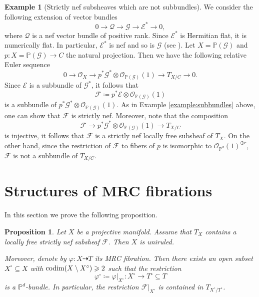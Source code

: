 \documentclass[english,reqno]{amsart}
\newcommand\bbP{{\mathbb P}}
\newcommand\sE{{\mathscr E}}
\newcommand\sF{{\mathscr F}}
\newcommand\sG{{\mathscr G}}
\newcommand\sO{{\mathscr O}}
\newcommand\sQ{{\mathscr Q}}
\newcommand{\codim}{{\rm codim}}
\theoremstyle{plain}
\newtheorem{prop}[thm]{Proposition}
\theoremstyle{definition}
\newtheorem{example}[thm]{Example}
\numberwithin{equation}{section} %
\begin{document}
\begin{example}[Strictly nef subsheaves which are not subbundles]\label{example:not-subbundles}
    We consider the following extension of vector bundles
    \[0\rightarrow \sQ\rightarrow \sG\rightarrow \sE^*\rightarrow 0,\]
    where $\sQ$ is a nef vector bundle of positive rank.    Since $\sE^*$ is Hermitian flat, it is numerically flat. In particular, $\sE^*$ is nef and so is $\sG$ (see \cite[Proposition 1.15]{DemaillyPeternellSchneider1994}).
    Let $X=\bbP(\sG)$ and  $p\colon X= \bbP(\sG)\rightarrow C$ the natural projection. Then we have the following relative Euler sequence
    \[0\rightarrow \sO_X\rightarrow p^*\sG^*\otimes\sO_{\bbP(\sG)}(1)\rightarrow T_{X/C}\rightarrow 0.\]
    Since $\sE$ is a subbundle of $\sG^*$, it follows that
    $$ \sF \coloneqq p^*\sE\otimes \sO_{\bbP(\sG)}(1)$$ is a subbundle of $p^*\sG^*\otimes \sO_{\bbP(\sG)}(1)$.
    As in Example \ref{example:subbundles} above, one can  show that  $\sF$ is strictly nef.
    Moreover,  note that the composition
    \[\sF \rightarrow p^*\sG^*\otimes \sO_{\bbP(\sG)}(1)\rightarrow T_{X/C}\]
    is injective, it follows that $\sF$ is a strictly nef locally free subsheaf of $T_X$. On the other hand, since the restriction of $\sF$ to fibers of $p$ is isomorphic to $\sO_{\bbP^d}(1)^{\oplus r}$,  $\sF$ is not a subbundle of $T_{X/C}$.
\end{example}















\baselineskip




\section{Structures of MRC fibrations}


\label{section:uniruled}

 In this section we prove the following proposition.


\begin{prop}\label{MRC-fibration}
    Let $X$ be a projective manifold. Assume that $T_X$ contains a  locally free strictly nef subsheaf $\sF$. Then $X$ is uniruled. 
    
    Moreover, denote by  $\varphi\colon X\dashrightarrow T$  its MRC fibration. Then there exists an open subset $X^\circ\subseteq X$ with $\codim(X\setminus X^\circ)\geqslant 2$ such that the restriction
    \[\varphi^\circ\coloneqq\varphi\vert_{X^\circ}\colon X^\circ\rightarrow T^\circ\subseteq T\]
    is a $\bbP^d$-bundle. In particular, the restriction $\sF\vert_{X^\circ}$ is contained in $T_{X^\circ/T^\circ}$.
\end{prop}
\end{document}
